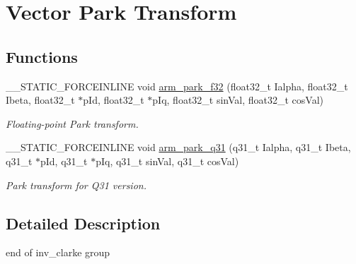 \hypertarget{group__park}{}\section{Vector Park Transform}
\label{group__park}
\subsection*{Functions}
\begin{DoxyCompactItemize}
\item 
\+\_\+\+\_\+\+S\+T\+A\+T\+I\+C\+\_\+\+F\+O\+R\+C\+E\+I\+N\+L\+I\+NE void \mbox{\hyperlink{group__park_ga18f92d09e080edc98a00c01886b56b5d}{arm\+\_\+park\+\_\+f32}} (float32\+\_\+t Ialpha, float32\+\_\+t Ibeta, float32\+\_\+t $\ast$p\+Id, float32\+\_\+t $\ast$p\+Iq, float32\+\_\+t sin\+Val, float32\+\_\+t cos\+Val)
\begin{DoxyCompactList}\small\item\em Floating-\/point Park transform. \end{DoxyCompactList}\item 
\+\_\+\+\_\+\+S\+T\+A\+T\+I\+C\+\_\+\+F\+O\+R\+C\+E\+I\+N\+L\+I\+NE void \mbox{\hyperlink{group__park_ga69be76685149b18f345f705aa8efaad0}{arm\+\_\+park\+\_\+q31}} (q31\+\_\+t Ialpha, q31\+\_\+t Ibeta, q31\+\_\+t $\ast$p\+Id, q31\+\_\+t $\ast$p\+Iq, q31\+\_\+t sin\+Val, q31\+\_\+t cos\+Val)
\begin{DoxyCompactList}\small\item\em Park transform for Q31 version. \end{DoxyCompactList}\end{DoxyCompactItemize}


\subsection{Detailed Description}
end of inv\+\_\+clarke group

